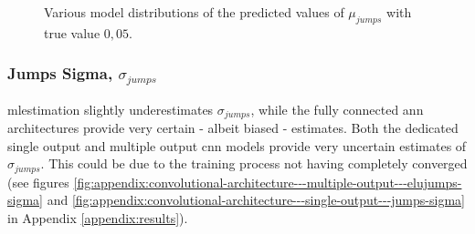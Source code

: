 \documentclass[11pt,oneside,openany,a4paper,english, report, goldenblock
]{usthesis}
\begin{document}
\begin{figure}[h]
{\begin{subfloatrow}
	\end{subfloatrow}}{
		\caption{Various model distributions of the predicted values of $\mu_{jumps}$ with true value $0,05$.}
		\label{fig:individual-parameter-estimation-results--mu_jumps}}
\end{figure}

\subsubsection{Jumps Sigma, $\sigma_{jumps}$}
\acrshort{mlestimation} slightly underestimates $\sigma_{jumps}$, while the fully connected \acrshort{ann} architectures provide very certain - albeit biased - estimates. Both the dedicated single output and multiple output \acrshort{cnn} models provide very uncertain estimates of $\sigma_{jumps}$. This could be due to the training process not having completely converged (see figures \ref{fig:appendix:convolutional-architecture---multiple-output---elujumps-sigma} and \ref{fig:appendix:convolutional-architecture---single-output---jumps-sigma} in Appendix \ref{appendix:results}).
\end{document}
